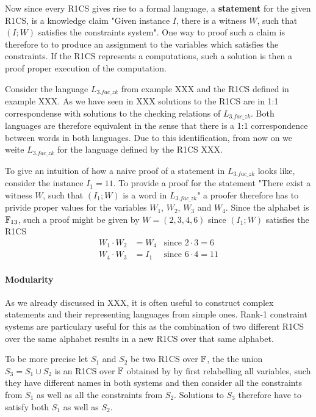 Now since every R1CS gives rise to a formal language, a \textbf{statement} for the given R1CS, is a knowledge claim "Given instance $I$, there is a witness $W$, such that $(I;W)$ satisfies the constraints system". One way to proof such a claim is therefore to to produce an assignment to the variables which satisfies the constraints. If the R1CS represents a computations, such a solution is then a proof proper execution of the computation.
\begin{example}[3-Factorization]Consider the language $L_{3.fac\_zk}$ from example XXX and the R1CS defined in example XXX. As we have seen in XXX solutions to the R1CS are in 1:1 correspondense with solutions to the checking relations of $L_{3.fac\_zk}$. Both languages are therefore equivalent in the sense that there is a 1:1 correspondence between words in both languages. Due to this identification, from now on we weite $L_{3.fac\_zk}$ for the language defined by the R1CS XXX.

To give an intuition of how a naive proof of a statement in $L_{3.fac\_zk}$ looks like, consider the instance $I_1= 11$. To provide a proof for the statement "There exist a witness $W$, such that $(I_1;W)$ is a word in $L_{3.fac\_zk}$" a proofer therefore has to privide proper values for the variables $W_1$, $W_2$, $W_3$ and $W_4$. Since the alphabet is $\mathbb{F}_{13}$, such a proof might be given by
$W=(2,3,4,6)$ since $(I_1;W)$ satisfies the R1CS
\begin{align*}
W_1 \cdot W_2 &= W_4 & \text{since } 2\cdot 3 = 6\\
W_4 \cdot W_3 &= I_1 & \text{since } 6\cdot 4 = 11
\end{align*}
\end{example}
\paragraph{Modularity} As we already discussed in XXX, it is often useful to construct complex statements and their representing languages from simple ones. Rank-1 constraint systems are particulary useful for this as the combination of two different R1CS over the same alphabet results in a new R1CS over that same alphabet. 

To be more precise let $S_1$ and $S_2$ be two R1CS over $\mathbb{F}$, the the union 
$S_3 = S_1\cup S_2$ is an R1CS over $\mathbb{F}$ obtained by by first relabelling all variables, such they have different names in both systems and then consider all the constraints from $S_1$ as well as all the constraints from $S_2$. Solutions to $S_3$ therefore have to satisfy both $S_1$ as well as $S_2$. 

